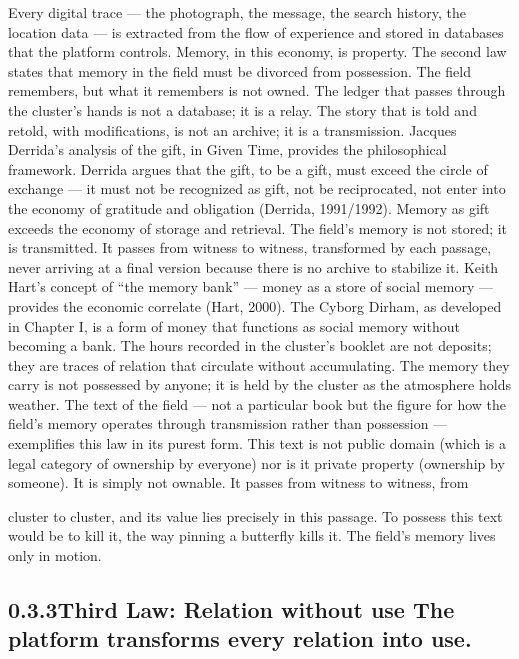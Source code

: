 Every digital trace — the photograph, the message, the search history, the location data — is extracted from the flow of experience and stored in databases that the platform controls. Memory, in this economy, is property. The second law states that memory in the field must be divorced from possession. The field remembers, but what it remembers is not owned. The ledger that passes through the cluster’s hands is not a database; it is a relay. The story that is told and retold, with modifications, is not an archive; it is a transmission. Jacques Derrida’s analysis of the gift, in Given Time, provides the philosophical framework. Derrida argues that the gift, to be a gift, must exceed the circle of exchange — it must not be recognized as gift, not be reciprocated, not enter into the economy of gratitude and obligation (Derrida, 1991/1992). Memory as gift exceeds the economy of storage and retrieval. The field’s memory is not stored; it is transmitted. It passes from witness to witness, transformed by each passage, never arriving at a final version because there is no archive to stabilize it. Keith Hart’s concept of “the memory bank” — money as a store of social memory — provides the economic correlate (Hart, 2000). The Cyborg Dirham, as developed in Chapter I, is a form of money that functions as social memory without becoming a bank. The hours recorded in the cluster’s booklet are not deposits; they are traces of relation that circulate without accumulating. The memory they carry is not possessed by anyone; it is held by the cluster as the atmosphere holds weather. The text of the field — not a particular book but the figure for how the field’s memory operates through transmission rather than possession — exemplifies this law in its purest form. This text is not public domain (which is a legal category of ownership by everyone) nor is it private property (ownership by someone). It is simply not ownable. It passes from witness to witness, from

cluster to cluster, and its value lies precisely in this passage. To possess this text would be to kill it, the way pinning a butterfly kills it. The field’s memory lives only in motion.

\subsection{0.3.3\quad Third Law: Relation without use The platform transforms every relation into use.}

